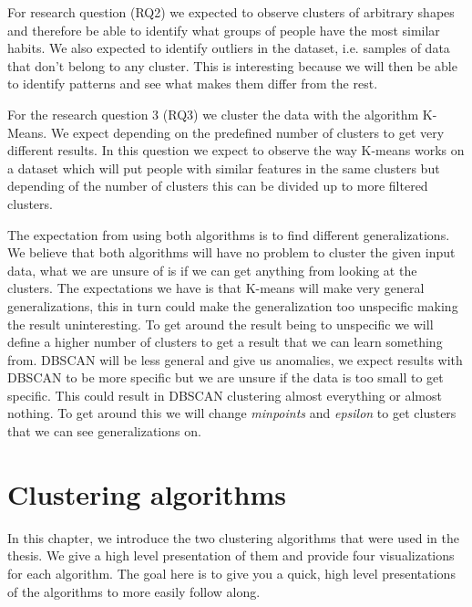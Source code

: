 \documentclass[a4paper]{article}
\begin{document}
For research question (RQ2) we expected to observe clusters of arbitrary shapes and therefore be able to identify what groups of people have the most similar habits. We also expected to identify outliers in the dataset, i.e. samples of data that don't belong to any cluster. This is interesting because we will then be able to identify patterns and see what makes them differ from the rest. 

For the research question 3 (RQ3) we cluster the data with the algorithm K-Means. We expect depending on the predefined number of clusters to get very different results. In this question we expect to observe the way K-means works on a dataset which will put people with similar features in the same clusters but depending of the number of clusters this can be divided up to more filtered clusters.

The expectation from using both algorithms is to find different generalizations. We believe that both algorithms will have no problem to cluster the given input data, what we are unsure of is if we can get anything from looking at the clusters. The expectations we have is that K-means will make very general generalizations, this in turn could make the generalization too unspecific making the result uninteresting. To get around the result being to unspecific we will define a higher number of clusters to get a result that we can learn something from.
DBSCAN will be less general and give us anomalies, we expect results with DBSCAN to be more specific but we are unsure if the data is too small to get specific. This could result in DBSCAN clustering almost everything or almost nothing. To get around this we will change \textit{minpoints} and \textit{epsilon} to get clusters that we can see generalizations on.


\newpage
\section{Clustering algorithms}
% 
% 
% 
%
In this chapter, we introduce the two clustering algorithms that were used in the thesis. We give a high level presentation of them and provide four visualizations for each algorithm. The goal here is to give you a quick, high level presentations of the algorithms to more easily follow along.
\end{document}
